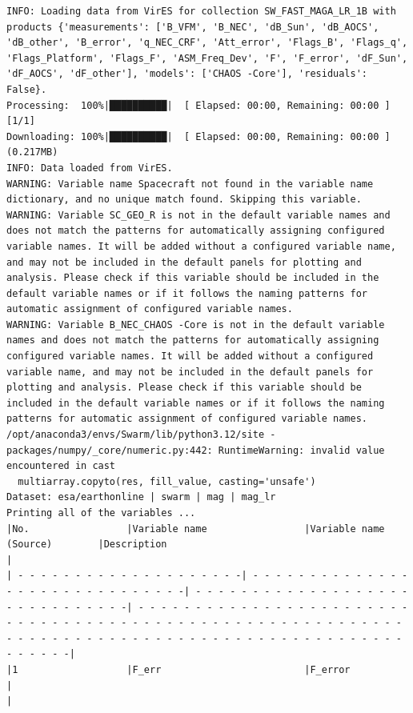 \begin{verbatim}
INFO: Loading data from VirES for collection SW_FAST_MAGA_LR_1B with products {'measurements': ['B_VFM', 'B_NEC', 'dB_Sun', 'dB_AOCS', 'dB_other', 'B_error', 'q_NEC_CRF', 'Att_error', 'Flags_B', 'Flags_q', 'Flags_Platform', 'Flags_F', 'ASM_Freq_Dev', 'F', 'F_error', 'dF_Sun', 'dF_AOCS', 'dF_other'], 'models': ['CHAOS -Core'], 'residuals': False}.
Processing:  100%|██████████|  [ Elapsed: 00:00, Remaining: 00:00 ] [1/1] 
Downloading: 100%|██████████|  [ Elapsed: 00:00, Remaining: 00:00 ] (0.217MB)
INFO: Data loaded from VirES.
WARNING: Variable name Spacecraft not found in the variable name dictionary, and no unique match found. Skipping this variable.
WARNING: Variable SC_GEO_R is not in the default variable names and does not match the patterns for automatically assigning configured variable names. It will be added without a configured variable name, and may not be included in the default panels for plotting and analysis. Please check if this variable should be included in the default variable names or if it follows the naming patterns for automatic assignment of configured variable names.
WARNING: Variable B_NEC_CHAOS -Core is not in the default variable names and does not match the patterns for automatically assigning configured variable names. It will be added without a configured variable name, and may not be included in the default panels for plotting and analysis. Please check if this variable should be included in the default variable names or if it follows the naming patterns for automatic assignment of configured variable names.
/opt/anaconda3/envs/Swarm/lib/python3.12/site -packages/numpy/_core/numeric.py:442: RuntimeWarning: invalid value encountered in cast
  multiarray.copyto(res, fill_value, casting='unsafe')
Dataset: esa/earthonline | swarm | mag | mag_lr
Printing all of the variables ...
|No.                 |Variable name                 |Variable name (Source)        |Description                                                                                         |
| - - - - - - - - - - - - - - - - - - - -| - - - - - - - - - - - - - - - - - - - - - - - - - - - - - -| - - - - - - - - - - - - - - - - - - - - - - - - - - - - - -| - - - - - - - - - - - - - - - - - - - - - - - - - - - - - - - - - - - - - - - - - - - - - - - - - - - - - - - - - - - - - - - - - - - - - - - - - - - - - - - - - - - - - - - - - - - - - - - - - - - -|
|1                   |F_err                         |F_error                       |                                                                                                    |

\end{verbatim}
